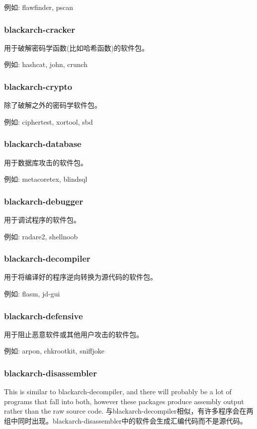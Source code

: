 \documentclass[a4paper, oneside, 11pt]{book}
\begin{document}
例如: flawfinder, pscan

\subsubsection{blackarch-cracker}
用于破解密码学函数(比如哈希函数)的软件包。

例如: hashcat, john, crunch

\subsubsection{blackarch-crypto}
除了破解之外的密码学软件包。

例如: ciphertest, xortool, sbd

\subsubsection{blackarch-database}
用于数据库攻击的软件包。

例如: metacoretex, blindsql

\subsubsection{blackarch-debugger}
用于调试程序的软件包。

例如: radare2, shellnoob

\subsubsection{blackarch-decompiler}
用于将编译好的程序逆向转换为源代码的软件包。

例如: flasm, jd-gui

\subsubsection{blackarch-defensive}
用于阻止恶意软件或其他用户攻击的软件包。

例如: arpon, chkrootkit, sniffjoke

\subsubsection{blackarch-disassembler}
This is similar to blackarch-decompiler, and there will probably be a lot
of programs that fall into both, however these packages produce assembly output
rather than the raw source code.
与blackarch-decompiler相似，有许多程序会在两组中同时出现。blackarch-disassembler中的软件会生成汇编代码而不是源代码。
\end{document}
